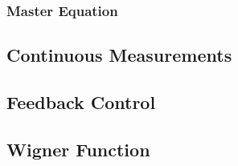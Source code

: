\subsubsection{Master Equation}
\subsection{Continuous Measurements}
\subsection{Feedback Control}
\subsection{Wigner Function}
